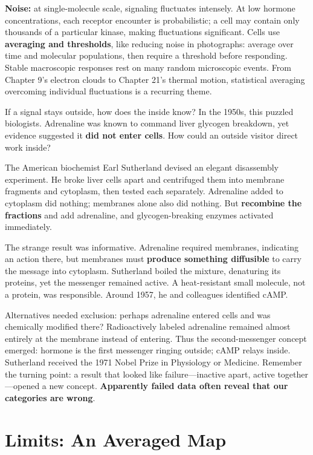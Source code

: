 \textbf{Noise:} at single-molecule scale, signaling fluctuates intensely. At low hormone concentrations, each receptor encounter is probabilistic; a cell may contain only thousands of a particular kinase, making fluctuations significant. Cells use \textbf{averaging and thresholds}, like reducing noise in photographs: average over time and molecular populations, then require a threshold before responding. Stable macroscopic responses rest on many random microscopic events. From Chapter 9's electron clouds to Chapter 21's thermal motion, statistical averaging overcoming individual fluctuations is a recurring theme.

\begin{zhengju}
If a signal stays outside, how does the inside know? In the 1950s, this puzzled biologists. Adrenaline was known to command liver glycogen breakdown, yet evidence suggested it \textbf{did not enter cells}. How could an outside visitor direct work inside?

The American biochemist Earl Sutherland devised an elegant disassembly experiment. He broke liver cells apart and centrifuged them into membrane fragments and cytoplasm, then tested each separately. Adrenaline added to cytoplasm did nothing; membranes alone also did nothing. But \textbf{recombine the fractions} and add adrenaline, and glycogen-breaking enzymes activated immediately.

The strange result was informative. Adrenaline required membranes, indicating an action there, but membranes must \textbf{produce something diffusible} to carry the message into cytoplasm. Sutherland boiled the mixture, denaturing its proteins, yet the messenger remained active. A heat-resistant small molecule, not a protein, was responsible. Around 1957, he and colleagues identified cAMP.

Alternatives needed exclusion: perhaps adrenaline entered cells and was chemically modified there? Radioactively labeled adrenaline remained almost entirely at the membrane instead of entering. Thus the second-messenger concept emerged: hormone is the first messenger ringing outside; cAMP relays inside. Sutherland received the 1971 Nobel Prize in Physiology or Medicine. Remember the turning point: a result that looked like failure---inactive apart, active together---opened a new concept. \textbf{Apparently failed data often reveal that our categories are wrong}.
\end{zhengju}

\section{Limits: An Averaged Map}

